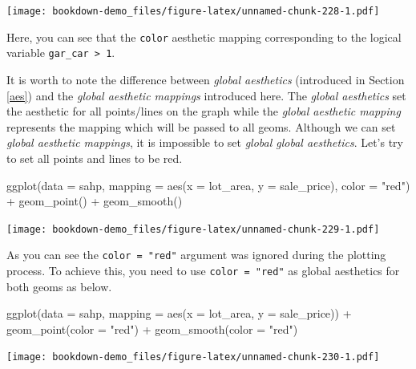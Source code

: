 \documentclass[
]{book}
\newenvironment{Shaded}{\begin{snugshade}}{\end{snugshade}}
\newcommand{\AttributeTok}[1]{\textcolor[rgb]{0.77,0.63,0.00}{#1}}
\newcommand{\FunctionTok}[1]{\textcolor[rgb]{0.00,0.00,0.00}{#1}}
\newcommand{\NormalTok}[1]{#1}
\newcommand{\SpecialCharTok}[1]{\textcolor[rgb]{0.00,0.00,0.00}{#1}}
\newcommand{\StringTok}[1]{\textcolor[rgb]{0.31,0.60,0.02}{#1}}
\begin{document}
\texttt{[image: bookdown-demo\_files/figure-latex/unnamed-chunk-228-1.pdf]}

Here, you can see that the \texttt{color} aesthetic mapping corresponding to the logical variable \texttt{gar\_car\ \textgreater{}\ 1}.

It is worth to note the difference between \emph{global aesthetics} (introduced in Section \ref{aes}) and the \emph{global aesthetic mappings} introduced here. The \emph{global aesthetics} set the aesthetic for all points/lines on the graph while the \emph{global aesthetic mapping} represents the mapping which will be passed to all geoms. Although we can set \emph{global aesthetic mappings}, it is impossible to set \emph{global global aesthetics}. Let's try to set all points and lines to be red.

\begin{Shaded}
\begin{Highlighting}[]
\FunctionTok{ggplot}\NormalTok{(}\AttributeTok{data =}\NormalTok{ sahp, }\AttributeTok{mapping =} \FunctionTok{aes}\NormalTok{(}\AttributeTok{x =}\NormalTok{ lot\_area, }\AttributeTok{y =}\NormalTok{ sale\_price), }\AttributeTok{color =} \StringTok{"red"}\NormalTok{) }\SpecialCharTok{+} \FunctionTok{geom\_point}\NormalTok{() }\SpecialCharTok{+} \FunctionTok{geom\_smooth}\NormalTok{()}
\end{Highlighting}
\end{Shaded}

\texttt{[image: bookdown-demo\_files/figure-latex/unnamed-chunk-229-1.pdf]}

As you can see the \texttt{color\ =\ "red"} argument was ignored during the plotting process. To achieve this, you need to use \texttt{color\ =\ "red"} as global aesthetics for both geoms as below.

\begin{Shaded}
\begin{Highlighting}[]
\FunctionTok{ggplot}\NormalTok{(}\AttributeTok{data =}\NormalTok{ sahp, }\AttributeTok{mapping =} \FunctionTok{aes}\NormalTok{(}\AttributeTok{x =}\NormalTok{ lot\_area, }\AttributeTok{y =}\NormalTok{ sale\_price)) }\SpecialCharTok{+} \FunctionTok{geom\_point}\NormalTok{(}\AttributeTok{color =} \StringTok{"red"}\NormalTok{) }\SpecialCharTok{+} \FunctionTok{geom\_smooth}\NormalTok{(}\AttributeTok{color =} \StringTok{"red"}\NormalTok{)}
\end{Highlighting}
\end{Shaded}

\texttt{[image: bookdown-demo\_files/figure-latex/unnamed-chunk-230-1.pdf]}
\end{document}
